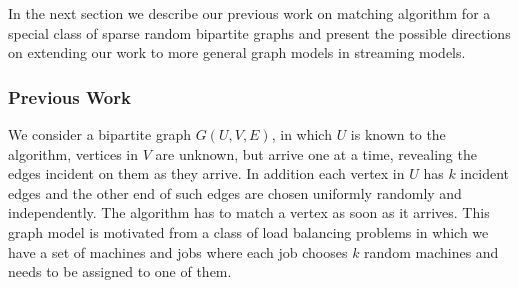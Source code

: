 \documentclass{scrartcl}
\begin{document}
 
 

In the next section we describe our previous work on matching algorithm for a special class of sparse random bipartite graphs and present the possible directions on extending our work to more general graph models in streaming models.

\subsubsection{Previous Work}
We consider a bipartite graph $G(U,V,E)$, in which $U$ is known to the algorithm, vertices in $V$ are
unknown, but arrive one at a time, revealing the edges incident on
them as they arrive. In addition each vertex in $U$ has $k$ incident edges and the other end of such edges are chosen uniformly randomly and independently. The algorithm has to match a vertex
as soon as it arrives. This graph model is motivated from a class of load balancing problems in which we have a set of machines and jobs where each job chooses $k$ random machines and needs to be assigned to one of them.
\end{document}
